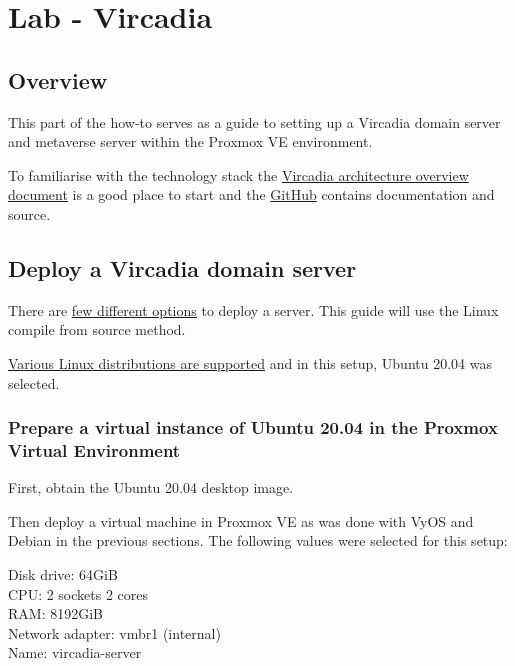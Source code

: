 \hypertarget{lab---vircadia}{%
\section{Lab - Vircadia}\label{lab---vircadia}}

\hypertarget{overview}{%
\subsection{Overview}\label{overview}}

This part of the how-to serves as a guide to setting up a Vircadia
domain server and metaverse server within the Proxmox VE environment.

To familiarise with the technology stack the
\href{https://docs.vircadia.com/explore/get-started/architecture.html}{Vircadia
architecture overview document} is a good place to start and the
\href{https://github.com/vircadia/}{GitHub} contains documentation and
source.

\hypertarget{deploy-a-vircadia-domain-server}{%
\subsection{Deploy a Vircadia domain
server}\label{deploy-a-vircadia-domain-server}}

There are \href{https://vircadia.com/deploy-a-server/}{few different
options} to deploy a server. This guide will use the Linux compile from
source method.

\href{https://github.com/vircadia/vircadia-builder\#supported-platforms}{Various
Linux distributions are supported} and in this setup, Ubuntu 20.04 was
selected.

\hypertarget{prepare-a-virtual-instance-of-ubuntu-20.04-in-the-proxmox-virtual-environment}{%
\subsubsection{Prepare a virtual instance of Ubuntu 20.04 in the Proxmox
Virtual
Environment}\label{prepare-a-virtual-instance-of-ubuntu-20.04-in-the-proxmox-virtual-environment}}

First, obtain the Ubuntu 20.04 desktop image.

Then deploy a virtual machine in Proxmox VE as was done with VyOS and
Debian in the previous sections. The following values were selected for
this setup:

Disk drive: 64GiB\\
CPU: 2 sockets 2 cores\\
RAM: 8192GiB\\
Network adapter: vmbr1 (internal)\\
Name: vircadia-server

